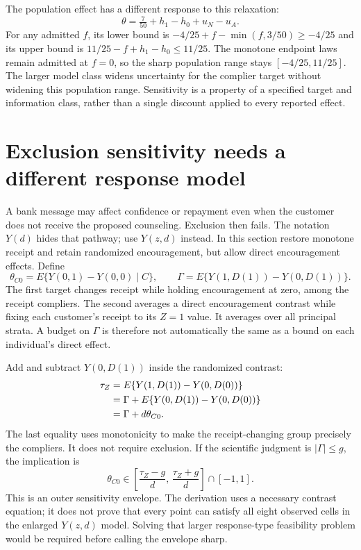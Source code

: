 The population effect has a different response to this relaxation:
\[
 \theta=\tfrac7{50}+h_1-h_0+u_N-u_A.
\]
For any admitted $f$, its lower bound is
$-4/25+f-\min(f,3/50)\geq-4/25$ and its upper bound is
$11/25-f+h_1-h_0\leq11/25$.
The monotone endpoint laws remain admitted at $f=0$, so the sharp
population range stays $[-4/25,11/25]$. The larger model class
widens uncertainty for the complier target without widening this
population range. Sensitivity is a property of a specified target and
information class, rather than a single discount applied to every
reported effect.\citep{exec17_s3_sensitivity}

\section{Exclusion sensitivity needs a different response model}
\label{exec17:s3-exclusion}

A bank message may affect confidence or repayment even when the customer
does not receive the proposed counseling. Exclusion then fails.
The notation $Y(d)$ hides that pathway; use $Y(z,d)$ instead.
In this section restore monotone receipt and retain randomized encouragement,
but allow direct encouragement effects. Define
\[
 \theta_{C0}=E\{Y(0,1)-Y(0,0)\mid C\},\qquad
 \Gamma=E\{Y(1,D(1))-Y(0,D(1))\}.
\]
The first target changes receipt while holding encouragement at zero,
among the receipt compliers. The second averages a direct encouragement
contrast while fixing each customer's receipt to its $Z=1$ value.
It averages over all principal strata. A budget on $\Gamma$ is therefore
not automatically the same as a bound on each individual's direct effect.

Add and subtract $Y(0,D(1))$ inside the randomized contrast:
\begin{align}
 \tau_Z
 &=E\{Y(1,D(1))-Y(0,D(0))\} \notag\\
 &=\Gamma+
   E\{Y(0,D(1))-Y(0,D(0))\} \notag\\
 &=\Gamma+d\theta_{C0}.
 \label{exec17:s3-exclusion-decomposition}
\end{align}
The last equality uses monotonicity to make the receipt-changing group
precisely the compliers. It does not require exclusion.
If the scientific judgment is $|\Gamma|\leq g$, the implication is
\[
 \theta_{C0}\in
 \left[\frac{\tau_Z-g}{d},\,\frac{\tau_Z+g}{d}\right]\cap[-1,1].
 \label{exec17:s3-exclusion-outer}
\]
This is an outer sensitivity envelope. The derivation uses a necessary
contrast equation; it does not prove that every point can satisfy all
eight observed cells in the enlarged $Y(z,d)$ model.
Solving that larger response-type feasibility problem would be required
before calling the envelope sharp.

